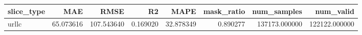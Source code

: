 \begin{tabular}{lrrrrrrr}
\toprule
slice_type & MAE & RMSE & R2 & MAPE & mask_ratio & num_samples & num_valid \\
\midrule
urllc & 65.073616 & 107.543640 & 0.169020 & 32.878349 & 0.890277 & 137173.000000 & 122122.000000 \\
\bottomrule
\end{tabular}
